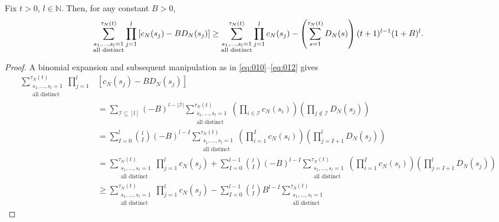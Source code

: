 \begin{lemma}\label{thm:sumprod3}
Fix $t>0$, $l\in\mathbb{N}$.
Then, for any constant $B>0$,
\begin{equation*}
\sum_{\substack{ s_1, \dots, s_l =1 \\ \text{\normalfont{all distinct}} }}^{\tau_N(t)} 
        \prod_{j=1}^l \left[ c_N(s_j) - B D_N(s_j) \right]
\geq \sum_{\substack{ s_1, \dots, s_l =1 \\ \text{\normalfont{all distinct}} }}^{\tau_N(t)} 
        \prod_{j=1}^l c_N(s_j)
        - \left( \sum_{s=1}^{\tau_N(t)} D_N(s) \right) (t+1)^{l-1} (1+B)^l .
\end{equation*}
\end{lemma}

\begin{proof}
A binomial expansion and subsequent manipulation as in \eqref{eq:010}--\eqref{eq:012} gives
\begin{align*}
\sum_{\substack{ s_1, \dots, s_l =1 \\ \text{all distinct} }}^{\tau_N(t)} 
        \prod_{j=1}^l 
        &\left[ c_N(s_j) - B D_N(s_j) \right] \\
&= \sum_{\mathcal{I} \subseteq [l]} (-B)^{l-|\mathcal{I}|}
        \sum_{\substack{ s_1, \dots, s_l =1 \\ \text{all distinct} }}^{\tau_N(t)}
        \left( \prod_{i\in\mathcal{I}} c_N(s_i) \right)
        \left( \prod_{j\notin\mathcal{I}} D_N(s_j) \right) \\
&= \sum_{I=0}^l \binom{l}{I} (-B)^{l-I} 
        \sum_{\substack{ s_1, \dots, s_l =1 \\ \text{all distinct} }}^{\tau_N(t)}
        \left( \prod_{i=1}^I c_N(s_i) \right)
        \left( \prod_{j=I+1}^l D_N(s_j) \right) \\
&= \sum_{\substack{ s_1, \dots, s_l =1 \\ \text{all distinct} }}^{\tau_N(t)} 
        \prod_{j=1}^l c_N(s_j)
        + \sum_{I=0}^{l-1} \binom{l}{I} (-B)^{l-I} 
        \sum_{\substack{ s_1, \dots, s_l =1 \\ \text{all distinct} }}^{\tau_N(t)}
        \left( \prod_{i=1}^I c_N(s_i) \right) 
        \left( \prod_{j=I+1}^l D_N(s_j) \right) \\
&\geq \sum_{\substack{ s_1, \dots, s_l =1 \\ \text{all distinct} }}^{\tau_N(t)} 
        \prod_{j=1}^l c_N(s_j)
        - \sum_{I=0}^{l-1} \binom{l}{I} B^{l-I} 
        \sum_{\substack{ s_1, \dots, s_l =1 \\ \text{all distinct} }}^{\tau_N(t)}

\end{align*}
\end{proof}
